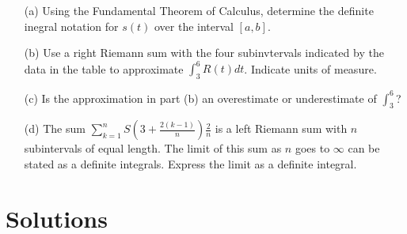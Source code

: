 \documentclass{article}
\newcommand{\qspace}{\vspace*{1.7em}}
\begin{document}
    \begin{enumerate}
        
        \item[(a)] Using the Fundamental Theorem of Calculus, determine the definite inegral notation for $s(t)$ over the interval $[a, b]$. \qspace 
        \item[(b)] Use a right Riemann sum with the four subinvtervals indicated by the data in the table to 
                   approximate $\int_3^6 R(t)dt$. Indicate units of measure. \qspace
        \item[(c)] Is the approximation in part (b) an overestimate or underestimate of $\int_3^6$? \qspace
        \item[(d)] The sum $\sum_{k = 1}^n S\left(3 + \frac{2(k - 1)}{n}\right)\frac{2}{n}$ is a left Riemann sum with $n$ subintervals of equal length. 
                   The limit of this sum as $n$ goes to $\infty$ can be stated as a definite integrals. Express the limit as a definite integral.

    \end{enumerate}
    \newpage



    \section*{Solutions}
\end{document}

